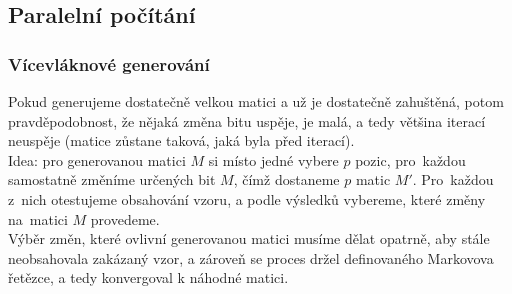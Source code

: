 \documentclass{beamer}
\begin{document}
\subsection{Paralelní počítání}
\begin{frame}
\frametitle{Vícevláknové generování}
Pokud generujeme dostatečně velkou matici a už je dostatečně zahuštěná, potom pravděpodobnost, že nějaká změna bitu uspěje, je malá, a tedy většina iterací neuspěje (matice zůstane taková, jaká byla před iterací).\\
\vspace{1em}
 Idea: pro generovanou matici $M$ si místo jedné vybere $p$ pozic, pro~každou samostatně změníme určených bit $M$, čímž dostaneme $p$ matic $M'$. Pro~každou z~nich otestujeme obsahování vzoru, a podle výsledků vybereme, které změny na~matici $M$ provedeme.\\
\vspace{1em}
 Výběr změn, které ovlivní generovanou matici musíme dělat opatrně, aby stále neobsahovala zakázaný vzor, a zároveň se proces držel definovaného Markovova řetězce, a tedy konvergoval k náhodné matici.
\end{frame}
\end{document}
